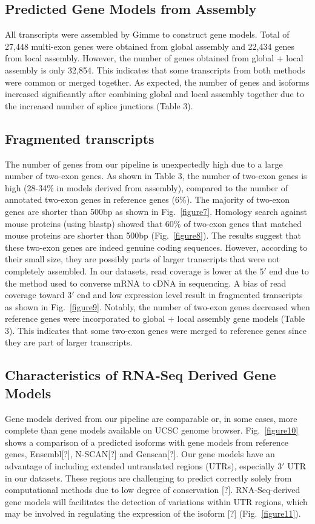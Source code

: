 \documentclass[10pt]{article}
\begin{document}
\subsection*{Predicted Gene Models from Assembly}

All transcripts were assembled by Gimme to construct gene models.
Total of 27,448 multi-exon genes were obtained from global assembly and 22,434 genes from local assembly.
However, the number of genes obtained from global + local assembly is only 32,854.
This indicates that some transcripts from both methods were common or merged together.
As expected, the number of genes and isoforms increased significantly after combining global and local assembly together due to the increased number of splice junctions (Table 3). 
      
\subsection*{Fragmented transcripts}
The number of genes from our pipeline is unexpectedly high due to a large number of two-exon genes. As shown in Table 3, the number of two-exon genes is high (28-34\% in models derived from assembly), compared to the number of annotated two-exon genes in reference genes (6\%).
The majority of two-exon genes are shorter than 500bp as shown in Fig.~\ref{figure7}.
Homology search against mouse proteins (using blastp) showed that 60\% of two-exon genes that matched mouse proteins are shorter than 500bp (Fig.~\ref{figure8}).
The results suggest that these two-exon genes are indeed genuine coding sequences.
However, according to their small size, they are possibly parts of larger transcripts that were not completely assembled.
In our datasets, read coverage is lower at the $5'$ end due to the method used to converse mRNA to cDNA in sequencing.
A bias of read coverage toward $3'$ end and low expression level result in fragmented transcripts as shown in Fig.~\ref{figure9}.
Notably, the number of two-exon genes decreased when reference genes were incorporated to global + local assembly gene models (Table 3).
This indicates that some two-exon genes were merged to reference genes since they are part of larger transcripts.

\subsection*{Characteristics of RNA-Seq Derived Gene Models}
Gene models derived from our pipeline are comparable or, in some cases, more complete than gene models available on UCSC genome browser\cite{ucscGenomeBrowser}.
Fig.~\ref{figure10} shows a comparison of a predicted isoforms with gene models from reference genes, Ensembl[?], N-SCAN[?] and Genscan[?].
Our gene models have an advantage of including extended untranslated regions (UTRs), especially $3'$ UTR in our datasets.
These regions are challenging to predict correctly solely from computational methods due to low degree of conservation [?].
RNA-Seq-derived gene models will facilitates the detection of variations within UTR regions, which may be involved in regulating the expression of the isoform [?] (Fig.~\ref{figure11}).
\end{document}
